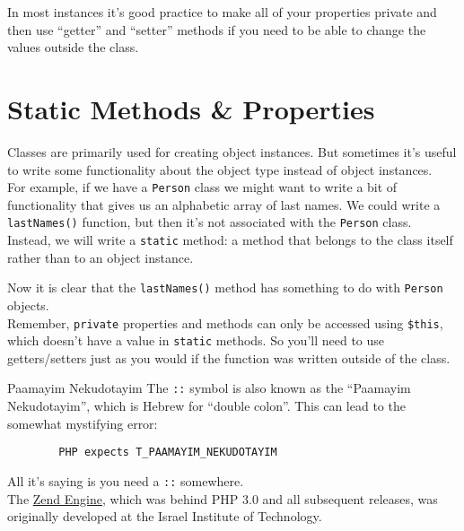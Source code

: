 In most instances it's good practice to make all of your properties private and then use ``getter'' and ``setter'' methods if you need to be able to change the values outside the class.


\section{Static Methods \& Properties}

Classes are primarily used for creating object instances. But sometimes it's useful to write some functionality about the object type instead of object instances.
\\

For example, if we have a \texttt{Person} class we might want to write a bit of functionality that gives us an alphabetic array of last names. We could write a \texttt{lastNames()} function, but then it's not associated with the \texttt{Person} class.
\\

Instead, we will write a \texttt{static} method: a method that belongs to the class itself rather than to an object instance.


Now it is clear that the \texttt{lastNames()} method has something to do with \texttt{Person} objects.
\\

Remember, \texttt{private} properties and methods can only be accessed using \texttt{\$this}, which doesn't have a value in \texttt{static} methods. So you'll need to use getters/setters just as you would if the function was written outside of the class.

\pagebreak

\begin{infobox}{Paamayim Nekudotayim}
    The \texttt{::} symbol is also known as the ``Paamayim Nekudotayim'', which is Hebrew for ``double colon''. This can lead to the somewhat mystifying error:

    \begin{verbatim}
        PHP expects T_PAAMAYIM_NEKUDOTAYIM
    \end{verbatim}

    All it's saying is you need a \texttt{::} somewhere.
    \\

    The \href{https://en.wikipedia.org/wiki/Zend_Engine}{Zend Engine}, which was behind PHP 3.0 and all subsequent releases, was originally developed at the Israel Institute of Technology.
\end{infobox}

